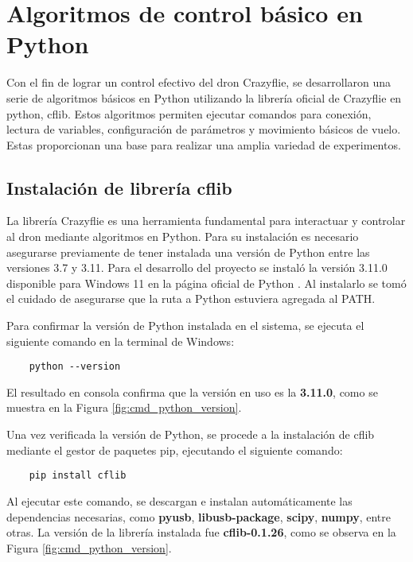 \section{Algoritmos de control básico en Python}
Con el fin de lograr un control efectivo del dron Crazyflie, se desarrollaron una serie de algoritmos básicos en Python utilizando la librería oficial de Crazyflie en python, cflib. Estos algoritmos permiten ejecutar comandos para conexión, lectura de variables, configuración de parámetros y movimiento básicos de vuelo. Estas proporcionan una base para realizar una amplia variedad de experimentos.

\subsection{Instalación de librería cflib}
La librería Crazyflie es una herramienta fundamental para interactuar y controlar al dron mediante algoritmos en Python. Para su instalación es necesario asegurarse previamente de tener instalada una versión de Python entre las versiones 3.7 y 3.11. Para el desarrollo del proyecto se instaló la versión 3.11.0 disponible para Windows 11 en la página oficial de Python \cite{Python_3_11_0}. Al instalarlo se tomó el cuidado de asegurarse que la ruta a Python estuviera agregada al PATH.

\newpage
Para confirmar la versión de Python instalada en el sistema, se ejecuta el siguiente comando en la terminal de Windows:

\begin{verbatim}
	python --version
\end{verbatim}

El resultado en consola confirma que la versión en uso es la \textbf{3.11.0}, como se muestra en la Figura \ref{fig:cmd_python_version}.

Una vez verificada la versión de Python, se procede a la instalación de cflib mediante el gestor de paquetes pip, ejecutando el siguiente comando:

\begin{verbatim}
	pip install cflib
\end{verbatim}

Al ejecutar este comando, se descargan e instalan automáticamente las dependencias necesarias, como \textbf{pyusb}, \textbf{libusb-package}, \textbf{scipy}, \textbf{numpy}, entre otras. La versión de la librería instalada fue \textbf{cflib-0.1.26}, como se observa en la Figura \ref{fig:cmd_python_version}.

